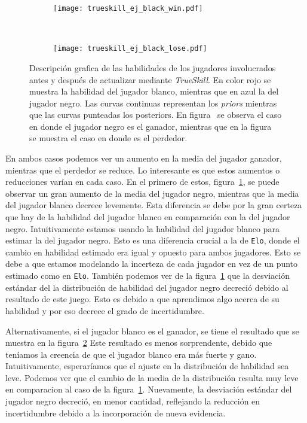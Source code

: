 \documentclass[11pt,twoside,spanish]{report} %
\begin{document}
\begin{figure}[H]
	\centering
	\begin{subfigure}[t]{.49\textwidth}
		\centering
	\texttt{[image: trueskill\_ej\_black\_win.pdf]}
	\caption{}
	\label{fig:ejTrueWin}
	\end{subfigure}
 	~
	\begin{subfigure}[t]{.49\textwidth}
		\centering
	\texttt{[image: trueskill\_ej\_black\_lose.pdf]}
	\caption{}
	\label{fig:ejTrueLose}
\end{subfigure}
	\caption{Descripci\'on grafica de las habilidades de los jugadores involucrados antes y despu\'es de actualizar mediante \textit{TrueSkill}. En color rojo se muestra la habilidad del jugador blanco, mientras que en azul la del jugador negro. Las curvas continuas representan los \textit{priors} mientras que las curvas punteadas los posteriors. En figura~ se observa el caso en donde el jugador negro es el ganador, mientras que en la figura~ se muestra el caso en donde es el perdedor.}
\label{fig:ejTrue}
\end{figure}

En ambos casos podemos ver  un aumento en la media del jugador ganador, mientras que el perdedor se reduce.
Lo interesante es que estos aumentos o reducciones var\'ian en cada caso.
En el primero de estos, figura~\ref{fig:ejTrueWin}, se puede observar un gran aumento de la media del jugador negro, mientras que la media del jugador blanco decrece levemente.
Esta diferencia se debe por la gran certeza que hay de la habilidad del jugador blanco en comparaci\'on con la del jugador negro.
Intuitivamente estamos usando la habilidad del jugador blanco para estimar la del jugador negro.
Esto es una diferencia crucial a la de \texttt{Elo}, donde el cambio en habilidad estimado era igual y opuesto para ambos jugadores.
Esto se debe a que estamos modelando la incerteza de cada jugador en vez de un punto estimado como en \texttt{Elo}.
Tambi\'en podemos ver de la figura~\ref{fig:ejTrueWin} que la desviaci\'on est\'andar del la distribuci\'on de habilidad del jugador negro decreci\'o debido al resultado de este juego.
Esto es debido a que aprendimos algo acerca de su habilidad y por eso decrece el grado de incertidumbre.

Alternativamente, si el jugador blanco es el ganador, se tiene el resultado que se muestra en la figura~\ref{fig:ejTrueLose}
Este resultado es menos sorprendente, debido que ten\'iamos la creencia de que el jugador blanco era m\'as fuerte y gano.
Intuitivamente, esperar\'iamos que el ajuste en la distribuci\'on de habilidad sea leve.
Podemos ver que el cambio de la media de la distribuci\'on resulta muy leve en comparacion al caso de la figura~\ref{fig:ejTrueWin}.
Nuevamente, la desviaci\'on est\'andar del jugador negro decreci\'o, en menor cantidad, reflejando la reducci\'on en incertidumbre debido a la incorporaci\'on de nueva evidencia.
\end{document}
